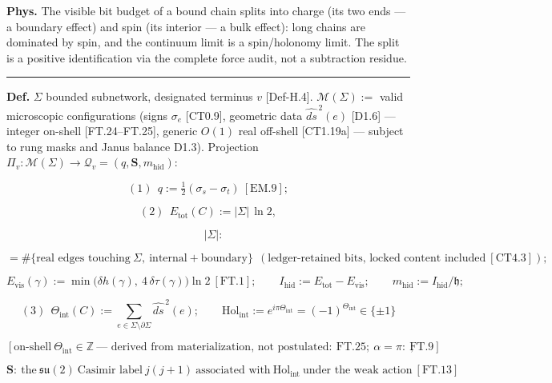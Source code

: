 \begin{theorem}
\textbf{Phys.} The visible bit budget of a bound chain splits into charge (its two ends — a boundary effect) and spin (its interior — a bulk effect): long chains are dominated by spin, and the continuum limit is a spin/holonomy limit. The split is a positive identification via the complete force audit, not a subtraction residue.

\vspace{2pt}\noindent\rule{\textwidth}{0.4pt}\vspace{2pt}

\end{theorem}

\begin{definition}\label{tag:Def-H-9}
\textbf{Def.} $\Sigma$ bounded subnetwork, designated terminus $v$ [Def-H.4]. $\mathcal M(\Sigma):=$ valid microscopic configurations (signs $\sigma_e$ [CT0.9], geometric data $\widehat{ds}^{\,2}(e)$ [D1.6] — integer on-shell [FT.24–FT.25], generic $O(1)$ real off-shell [CT1.19a] — subject to rung masks and Janus balance D1.3). Projection $\Pi_v:\mathcal M(\Sigma)\to\mathcal Q_v=(q,\mathbf S,m_{\mathrm{hid}})$:

\[
(1)\ \ q:=\tfrac12(\sigma_s-\sigma_t)\ [\mathrm{EM.9}];
\]

\[
(2)\ \ E_{\mathrm{tot}}(C):=|\Sigma|\,\ln2,
\]

\[
\quad |\Sigma|:
\]

\[
= \#\{\text{real edges touching}\ \Sigma,\ \text{internal}+\text{boundary}\}\ \ (\text{ledger-retained bits, locked content included}\ [\mathrm{CT4.3}]);
\]

\[
E_{\mathrm{vis}}(\gamma):=\min\bigl(\delta h(\gamma),\ 4\,\delta\tau(\gamma)\bigr)\ln2\ [\mathrm{FT.1}];\qquad
I_{\mathrm{hid}}:=E_{\mathrm{tot}}-E_{\mathrm{vis}};\qquad
m_{\mathrm{hid}}:=I_{\mathrm{hid}}/\mathfrak h;
\]

\[
(3)\ \ \Theta_{\mathrm{int}}(C):=\!\!\sum_{e\in\Sigma\setminus\partial\Sigma}\!\!\widehat{ds}^{\,2}(e);\qquad
\mathrm{Hol}_{\mathrm{int}}:=e^{i\pi\Theta_{\mathrm{int}}}=(-1)^{\Theta_{\mathrm{int}}}\in\{\pm1\}
\]

\[
[\text{on-shell}\ \Theta_{\mathrm{int}}\in\mathbb Z\ \text{— derived from materialization, not postulated}:\ \mathrm{FT.25};\ \alpha=\pi:\ \mathrm{FT.9}];
\]

\[
\mathbf S:\ \text{the}\ \mathfrak{su}(2)\ \text{Casimir label}\ j(j{+}1)\ \text{associated with}\ \mathrm{Hol}_{\mathrm{int}}\ \text{under the weak action}\ [\mathrm{FT.13}]
\]


\end{definition}
